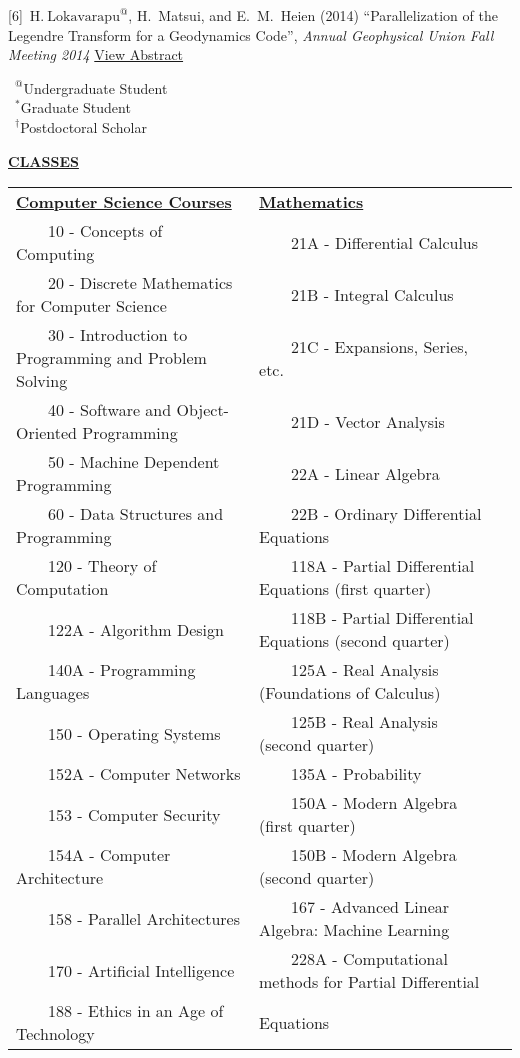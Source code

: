 \documentclass[11pt]{ltxdoc}
\newcommand{\tabitem}{~~\llap{\textbullet}~~}
\begin{document}
\hangindent 20pt
[6]~$\mathrm{H.~Lokavarapu}^{@}$, H.~Matsui, and E.~M.~Heien (2014) 
``Parallelization of the Legendre Transform for a Geodynamics Code'', 
\textit{Annual Geophysical Union Fall Meeting 2014}
\href{http://adsabs.harvard.edu/abs/2014AGUFMDI11A4255L}{View Abstract}

\vskip 18pt

$\phantom{0}^@$Undergraduate Student        \\
$\phantom{0}^*$Graduate Student             \\
$\phantom{0}^{\dagger}$Postdoctoral Scholar

\newpage

\begin{center}
  \textbf{\underline{CLASSES}}
\end{center}

\vskip -6pt

\begin{tabular}{lll}
  \textbf{\underline{Computer Science Courses}} & \textbf{\underline{Mathematics}} \\
  \tabitem 10 - Concepts of Computing & \tabitem 21A - Differential Calculus \\
  \tabitem 20 - Discrete Mathematics for Computer Science & 	\tabitem 21B - Integral Calculus \\
  \tabitem 30 - Introduction to Programming and Problem Solving & 	\tabitem 21C - Expansions, Series, etc. \\
  \tabitem 40 - Software and Object-Oriented Programming & 	\tabitem 21D - Vector Analysis \\
  \tabitem 50 - Machine Dependent Programming & 	\tabitem 22A - Linear Algebra \\
  \tabitem 60 - Data Structures and Programming & 	\tabitem 22B - Ordinary Differential Equations \\
  \tabitem 120 - Theory of Computation & 	\tabitem 118A - Partial Differential Equations   (first quarter) \\
  \tabitem 122A - Algorithm Design & 	\tabitem 118B - Partial Differential Equations   (second quarter) \\
  \tabitem 140A - Programming Languages & 	\tabitem 125A - Real Analysis (Foundations of Calculus) \\
  \tabitem 150 - Operating Systems & 	\tabitem 125B - Real Analysis (second quarter) \\
  \tabitem 152A - Computer Networks & 	\tabitem 135A - Probability \\
  \tabitem 153 - Computer Security & 	\tabitem 150A - Modern Algebra (first quarter) \\
  \tabitem 154A - Computer Architecture & 	\tabitem 150B - Modern Algebra (second quarter) \\
  \tabitem 158 - Parallel Architectures & 	\tabitem 167  - Advanced Linear Algebra: Machine Learning \\
  \tabitem 170 - Artificial Intelligence & 	\tabitem 228A - Computational methods for Partial Differential \\
  \tabitem 188 - Ethics in an Age of Technology & \qquad\qquad Equations
\end{tabular}
\end{document}
